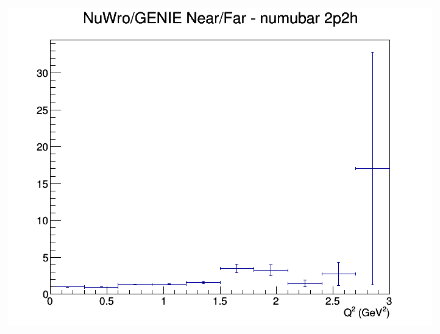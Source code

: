 \begin{figure}[h]
\endminipage
{}
\includegraphics[width=\linewidth]{eff_Q2/GAr/ratios/2p2h_NuWro_GENIE_numubar_NF_Q2.png}
\endminipage
\newline
\end{figure}
\clearpage

